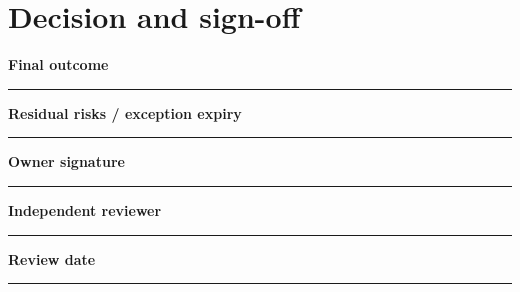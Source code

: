 \documentclass[11pt,letterpaper]{article}
\begin{document}
\section{Decision and sign-off}
\noindent\textbf{Final outcome}\par\nobreak\vspace{6pt}\noindent\rule{0.93\linewidth}{0.4pt}\par\vspace{14pt}
\noindent\textbf{Residual risks / exception expiry}\par\nobreak\vspace{6pt}\noindent\rule{0.93\linewidth}{0.4pt}\par\vspace{14pt}
\noindent\textbf{Owner signature}\par\nobreak\vspace{6pt}\noindent\rule{0.93\linewidth}{0.4pt}\par\vspace{14pt}
\noindent\textbf{Independent reviewer}\par\nobreak\vspace{6pt}\noindent\rule{0.93\linewidth}{0.4pt}\par\vspace{14pt}
\noindent\textbf{Review date}\par\nobreak\vspace{6pt}\noindent\rule{0.93\linewidth}{0.4pt}\par\vspace{14pt}
\end{document}

